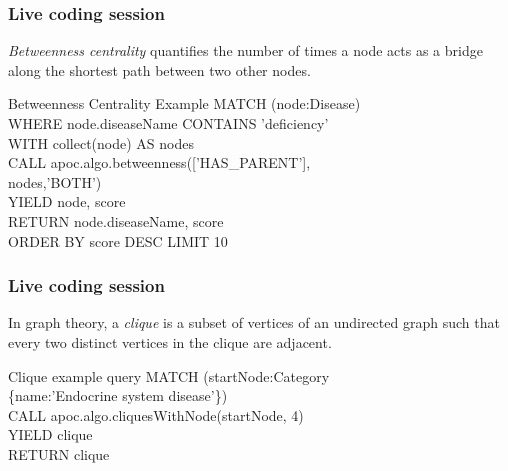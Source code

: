\documentclass[12pt]{beamer}
\begin{document}
    \begin{frame}
        \frametitle{Live coding session}
        \begin{Definition}
            \emph{Betweenness centrality} quantifies the number of times a node acts as a bridge along the shortest path between two other nodes.\footnotemark
        \end{Definition}
        \begin{block}{Betweenness Centrality Example}
            MATCH (node:Disease)\\
            \hspace{1cm} WHERE node.diseaseName CONTAINS 'deficiency'\\
            \hspace{1cm} WITH collect(node) AS nodes\\
            CALL apoc.algo.betweenness(['HAS\_PARENT'],\\
            \hspace{6cm} nodes,'BOTH')\\
            \hspace{1cm} YIELD node, score\\
            RETURN node.diseaseName, score\\
            \hspace{1cm} ORDER BY score DESC LIMIT 10
        \end{block}
    \end{frame}
    
    \begin{frame}
        \frametitle{Live coding session}
        \begin{Definition}
            In graph theory, a \emph{clique} is a subset of vertices of an undirected graph such that every two distinct vertices in the clique are adjacent.
        \end{Definition}
        \begin{block}{Clique example query}
        MATCH (startNode:Category\\
        \hspace{3cm} \{name:'Endocrine system disease'\})\\
        \hspace{1cm} CALL apoc.algo.cliquesWithNode(startNode, 4)\\
        \hspace{1cm} YIELD clique\\
        RETURN clique
        \end{block}
    \end{frame}
    
\end{document}
